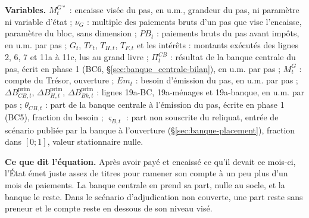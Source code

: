 \documentclass[11pt,a4paper]{article}
\newcommand{\variables}{\par\noindent\textbf{Variables.} }
\newcommand{\sens}{\par\noindent\textbf{Ce que dit l'équation.} }
\begin{document}
\begin{proposee}
\variables $M^{G*}_t$ : encaisse visée du pas, en u.m., grandeur du pas, ni paramètre ni variable d'état ; $\nu_G$ : multiple des paiements bruts d'un pas que vise l'encaisse, paramètre du bloc, sans dimension ; $\mathit{PB}_t$ : paiements bruts du pas avant impôts, en u.m. par pas ; $G_t$, $\mathit{Tr}_t$, $T_{H,t}$, $T_{F,t}$ et les intérêts : montants exécutés des lignes 2, 6, 7 et 11a à 11c, lus au grand livre ; $\Pi^{\mathit{CB}}_t$ : résultat de la banque centrale du pas, écrit en phase 1 (BC6, \S\ref{sec:banque_centrale-bilan}), en u.m. par pas ; $M^G_t$ : compte du Trésor, ouverture ; $\mathit{Em}_t$ : besoin d'émission du pas, en u.m. par pas ; $\Delta B^{\mathrm{prim}}_{\mathit{CB},t}$, $\Delta B^{\mathrm{prim}}_{H,t}$, $\Delta B^{\mathrm{prim}}_{\mathit{Bk},t}$ : lignes 19a-BC, 19a-ménages et 19a-banque, en u.m. par pas ; $\theta_{\mathit{CB},t}$ : part de la banque centrale à l'émission du pas, écrite en phase 1 (BC5), fraction du besoin ; $\varsigma_{B,t}$ : part non souscrite du reliquat, entrée de scénario publiée par la banque à l'ouverture (\S\ref{sec:banque-placement}), fraction dans $[0 ; 1]$, valeur stationnaire nulle.
\sens Après avoir payé et encaissé ce qu'il devait ce mois-ci, l'État émet juste assez de titres pour ramener son compte à un peu plus d'un mois de paiements. La banque centrale en prend sa part, nulle au socle, et la banque le reste. Dans le scénario d'adjudication non couverte, une part reste sans preneur et le compte reste en dessous de son niveau visé.

\end{proposee}
\end{document}
